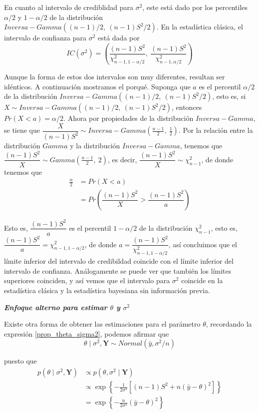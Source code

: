 En cuanto al intervalo de crediblidad para $\sigma^2$, este está dado por los percentiles $\alpha/2$ y $1-\alpha/2$ de la distribución $Inversa-Gamma((n-1)/2,\ (n-1)S^2/2)$. En la estadística clásica, el intervalo de confianza para $\sigma^2$ está dada por \begin{equation*}
IC(\sigma^2)=\left(\dfrac{(n-1)S^2}{\chi^2_{n-1,1-\alpha/2}},\ \dfrac{(n-1)S^2}{\chi^2_{n-1,\alpha/2}}\right)
\end{equation*}

Aunque la forma de estos dos intervalos son muy diferentes, resultan ser idénticos. A continuación mostramos el porqué. Suponga que $a$ es el percentil $\alpha/2$ de la distribución $Inversa-Gamma((n-1)/2,\ (n-1)S^2/2)$, esto es, si $X\sim Inversa-Gamma((n-1)/2,\ (n-1)S^2/2)$, entonces $Pr(X<a)=\alpha/2$. Ahora por propiedades de la distribución $Inversa-Gamma$, se tiene que $\dfrac{X}{(n-1)S^2}\sim Inversa-Gamma(\frac{n-1}{2},\ \frac{1}{2})$. Por la relación entre la distribución $Gamma$ y la distribución $Inversa-Gamma$, tenemos que $\dfrac{(n-1)S^2}{X}\sim Gamma(\frac{n-1}{2},\ 2)$, es decir, $\dfrac{(n-1)S^2}{X}\sim\chi^2_{n-1}$, de donde tenemos que
\begin{align*}
\frac{\alpha}{2}&=Pr(X<a)\\
&=Pr\left(\dfrac{(n-1)S^2}{X}>\dfrac{(n-1)S^2}{a}\right)
\end{align*}

Esto es, $\dfrac{(n-1)S^2}{a}$ es el percentil $1-\alpha/2$ de la distribución $\chi^2_{n-1}$, esto es,  $\dfrac{(n-1)S^2}{a}=\chi^2_{n-1,1-\alpha/2}$, de donde $a=\dfrac{(n-1)S^2}{\chi^2_{n-1,1-\alpha/2}}$, así concluimos que el límite inferior del intervalo de credibildad coincide con el límite inferior del intervalo de confianza. Análogamente se puede ver que también los límites superiores coinciden, y así vemos que el intervalo para $\sigma^2$ coincide en la estadística clásica y la estadística bayesiana sin información previa.

\textbf{\emph{Enfoque alterno para estimar $\theta$ y $\sigma^2$}}

Existe otra forma de obtener las estimaciones para el parámetro $\theta$, recordando la expresión \ref{prop_theta_sigma2}, podemos afirmar que 
\begin{equation*}
\theta \mid \sigma^2, \mathbf{Y} \sim Normal(\bar{y},\sigma^2/n)
\end{equation*}

puesto que 
\begin{align*}
p(\theta \mid \sigma^2,\mathbf{Y})&\propto p(\theta, \sigma^2 \mid\mathbf{Y})\\
&\propto\exp\left\{-\frac{1}{2\sigma^2}\left[(n-1)S^2+n(\bar{y}-\theta)^2\right]\right\}\\
&=\exp\left\{-\frac{n}{2\sigma^2}(\bar{y}-\theta)^2\right\}
\end{align*}

